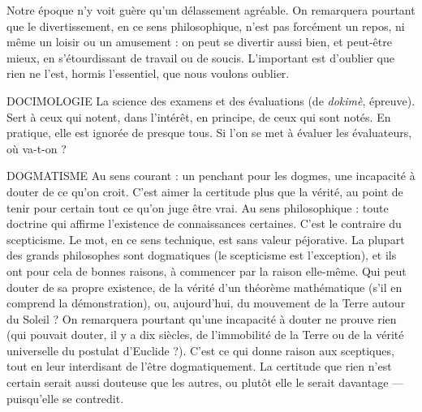 Notre époque n’y voit guère qu’un délassement agréable. On remarquera
pourtant que le divertissement, en ce sens philosophique, n’est pas forcément
un repos, ni même un loisir ou un amusement : on peut se divertir aussi bien,
et peut-être mieux, en s’étourdissant de travail ou de soucis. L'important est
d'oublier que rien ne l’est, hormis l'essentiel, que nous voulons oublier.

DOCIMOLOGIE La science des examens et des évaluations (de {\it dokimè},
épreuve). Sert à ceux qui notent, dans l'intérêt, en principe,
de ceux qui sont notés. En pratique, elle est ignorée de presque tous. Si
l’on se met à évaluer les évaluateurs, où va-t-on ?

DOGMATISME Au sens courant : un penchant pour les dogmes, une incapacité
à douter de ce qu’on croit. C’est aimer la certitude
plus que la vérité, au point de tenir pour certain tout ce qu’on juge être vrai.
Au sens philosophique : toute doctrine qui affirme l'existence de connaissances
certaines. C’est le contraire du scepticisme. Le mot, en ce sens technique,
est sans valeur péjorative. La plupart des grands philosophes sont dogmatiques
(le scepticisme est l’exception), et ils ont pour cela de bonnes raisons,
à commencer par la raison elle-même. Qui peut douter de sa propre existence,
de la vérité d’un théorème mathématique (s’il en comprend la démonstration),
ou, aujourd’hui, du mouvement de la Terre autour du Soleil ? On remarquera
pourtant qu’une incapacité à douter ne prouve rien (qui pouvait douter, il y a
dix siècles, de l’immobilité de la Terre ou de la vérité universelle du postulat
d’Euclide ?). C’est ce qui donne raison aux sceptiques, tout en leur interdisant
de l’être dogmatiquement. La certitude que rien n’est certain serait aussi douteuse
que les autres, ou plutôt elle le serait davantage — puisqu'elle se contredit.

